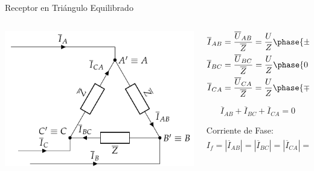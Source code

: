 \documentclass[aspectratio=169, usenames,svgnames,dvipsnames]{beamer}
\begin{document}
\begin{frame}[label={sec:orgf3930a6}]{Receptor en Triángulo Equilibrado}
\begin{columns}
\begin{column}{0.5\columnwidth}
\begin{center}
\includegraphics[width=.9\linewidth]{../figs/TrianguloEquilibrado_Receptor.pdf}
\end{center}
\end{column}

\begin{column}{0.5\columnwidth}
\begin{align*}
  \overline{I}_{AB} &= \frac{\overline{U}_{AB}}{\overline{Z}} = \frac{U}{Z}\phase{\ang{\pm 120} - \varphi} \\
  \overline{I}_{BC} &= \frac{\overline{U}_{BC}}{\overline{Z}} = \frac{U}{Z}\phase{0 - \varphi}\\
  \overline{I}_{CA} &= \frac{\overline{U}_{CA}}{\overline{Z}} = \frac{U}{Z}\phase{\ang{\mp 120} - \varphi}
\end{align*}

\[
   \overline{I}_{AB}  + \overline{I}_{BC} + \overline{I}_{CA}  = 0 
\]

Corriente de Fase:
\[
  \boxed{I_f = |\overline{I}_{AB}| = |\overline{I}_{BC}| = |\overline{I}_{CA}| = \frac{U}{Z}}
\]
\end{column}
\end{columns}
\end{frame}
\end{document}
